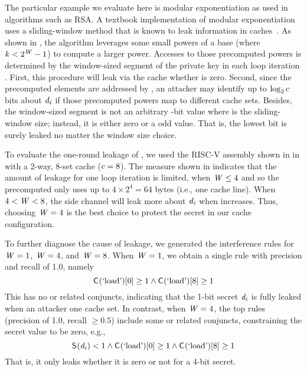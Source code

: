 The particular example we evaluate here is modular exponentiation as
used in algorithms such as RSA.  A textbook implementation of modular
exponentiation uses a sliding-window method that is known to leak
information in caches~\cite{zhang2012cross,bernstein2017sliding}.  As
shown in , the algorithm leverages some small
powers \precomputedPlaintext{\powerIdx} of a base \plaintext{} (where
$k< 2^{\mathit{W}}-1$) to compute a larger power.  Accesses to
those precomputed powers is determined by the window-sized segment
\privK{\modexpRound} of the private key \privK{} in each loop
iteration \modexpRound.  First, this procedure will leak via the cache
whether \privK{\modexpRound} is zero.  Second, since the precomputed
elements are addressed by \privK{\modexpRound}, an attacker may
identify up to $\log_2 c$ bits about
$\mathit{d_{i}}$ if those precomputed powers map to different
cache sets.  
Besides,  the window-sized segment
\privK{\modexpRound} is not an arbitrary \window-bit value where
\window is the sliding-window size; instead, it is either zero or a
odd value.  
  That is, the
lowest bit is surely leaked no matter the window size choice.
\fi

To evaluate the one-round leakage of , we used
the RISC-V assembly shown in  in \boom
with a 2-way, 8-set cache ($c=8$). The
\JaccardRand{\secretsSetSize} measure shown in
 indicates that the amount of leakage
for one loop iteration \modexpRound is limited, when $\mathit{W}\le4$ and
so the precomputed \plaintext{} only uses up to $4 \times 2^4=64$ bytes
(i.e., one cache line).  When $4<\mathit{W}<8$, the side channel will
leak more about $\mathit{d_{i}}$ when \window increases. Thus,
choosing $\mathit{W}=4$ is the best choice to protect the secret in our
cache configuration.

To further diagnose the cause of leakage, we generated the interference
rules for $\mathit{W}=1$, $\mathit{W}=4$, and $\mathit{W}=8$. When $\mathit{W}=1$,
we obtain a single rule with precision and recall of 1.0, namely
\[
\mathsf{C}_{}(\textrm{`load'})[0]\ge 1 \wedge \mathsf{C}_{}(\textrm{`load'})[8]\ge1
\]
This has no \SecFn{} or \SecFnAlt{} related conjuncts, indicating that
the 1-bit secret $\mathit{d_{i}}$ is fully leaked when an
attacker  one cache set.  In contrast, when $\mathit{W}=4$, the
top rules (precision of 1.0, recall $\ge 0.5$) include some \SecFn{}
or \SecFnAlt{} related conjuncts, constraining the secret value to be
zero, e.g.,
\[
\mathsf{S}_{}(\mathit{d_{i}}) <1
\wedge \mathsf{C}_{}(\textrm{`load'})[0]\ge 1 \wedge \mathsf{C}_{}(\textrm{`load'})[8]\ge
1
\]
That is, it only leaks whether it is zero or not for a 4-bit secret.

